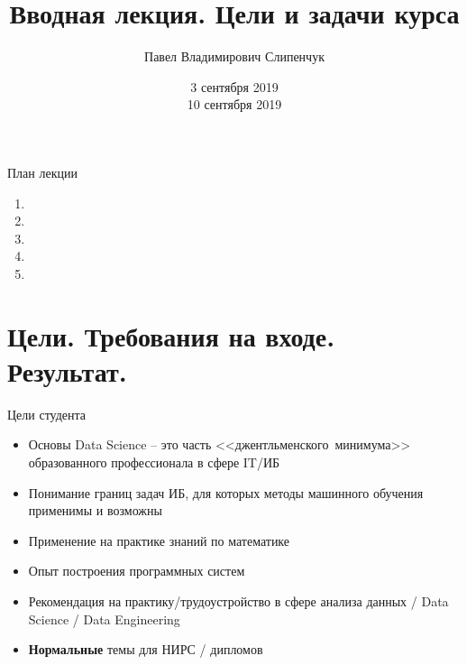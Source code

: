 


\title{Вводная лекция. Цели и задачи курса}
\date{3 сентября 2019 \\ 10 сентября 2019}
\author{Павел Владимирович Слипенчук}


  \maketitle
    
   \begin{frame}{План лекции}
   \begin{enumerate}
   	\item {}
   	\item {}
   		\item {}
   		\item {}
   		\item {}
   	\end{enumerate}
   \end{frame}
  
  
  \section{Цели. Требования на входе. Результат.}\label{section:goals}
    
  \begin{frame}{Цели студента}
  	\begin{itemize}
  		\item Основы Data Science -- это часть
  <<джентльменского~минимума>>
  образованного профессионала 
  в сфере IT/ИБ 
  		\item Понимание границ задач ИБ,
  для которых методы машинного обучения
  применимы и возможны
  		\item Применение на практике знаний
  по математике
  		\item Опыт построения программных систем
  		\item Рекомендация на практику/трудоустройство 
  в сфере анализа данных / Data Science / Data Engineering
  		\item \textbf{Нормальные} темы для НИРС / дипломов
  	\end{itemize}
  \end{frame}
  

